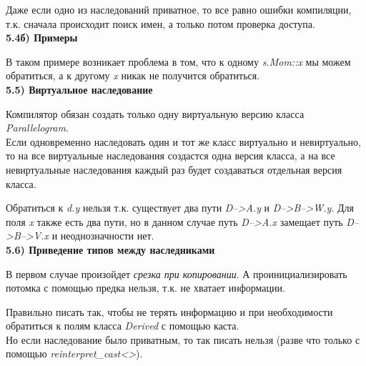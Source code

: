 \documentclass{article}
\begin{document}

Даже если одно из наследований приватное, то все равно ошибки компиляции, т.к. сначала происходит поиск имен, а только потом проверка доступа.\\
\noindent \textbf{5.4б) Примеры}

В таком примере возникает проблема в том, что к одному \textit{s.Mom::x} мы можем обратиться, а к другому \textit{x} никак не получится обратиться.\\
\noindent \textbf{5.5) Виртуальное наследование}

Компилятор обязан создать только одну виртуальную версию класса \textit{Parallelogram}.\\
Если одновременно наследовать один и тот же класс виртуально и невиртуально, то на все виртуальные наследования создастся одна версия класса, а на все невиртуальные наследования каждый раз будет создаваться отдельная версия класса.

Обратиться к \textit{d.y} нельзя т.к. существует два пути \textit{D-->A.y} и \textit{D-->B-->W.y}. Для поля \textit{x} также есть два пути, но в данном случае путь \textit{D-->A.x} замещает путь \textit{D-->B-->V.x} и неоднозначности нет.\\
\noindent \textbf{5.6) Приведение типов между наследниками}

В первом случае произойдет \textit{срезка при копировании}. А проинициализировать потомка с помощью предка нельзя, т.к. не хватает информации.

Правильно писать так, чтобы не терять информацию и при необходимости обратиться к полям класса \textit{Derived} с помощью каста.\\
Но если наследование было приватным, то так писать нельзя (разве что только с помощью \textit{reinterpret\_cast<>}). 
\end{document}
